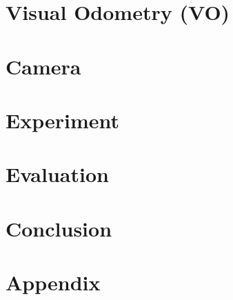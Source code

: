 \documentclass[oneside,12pt,bibtotoc]{scrreprt}
\begin{document}
\chapter{Visual Odometry (VO)}
    
    
\chapter{Camera}
    

\chapter{Experiment}
     
        
\chapter{Evaluation}    
      

\chapter{Conclusion}
    
    
        
\printbibliography[title={References}]

\appendix
\chapter{Appendix}

\end{document}
